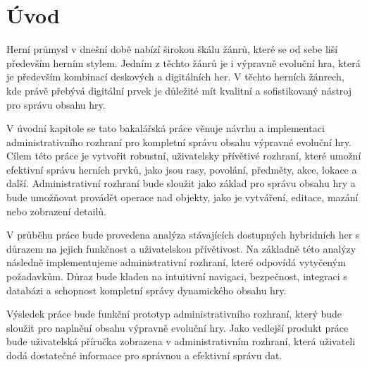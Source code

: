 \chapter{Úvod}
\label{ch:introduction}

Herní průmysl v dnešní době nabízí širokou škálu žánrů, které se od sebe liší především herním stylem. Jedním z těchto žánrů je i výpravně evoluční hra, která je především kombinací deskových a digitálních her. V těchto herních žánrech, kde právě přebývá digitální prvek je důležité mít kvalitní a sofistikovaný nástroj pro správu obsahu hry.

V úvodní kapitole se tato bakalářská práce věnuje návrhu a implementaci administrativního rozhraní pro kompletní správu obsahu výpravné evoluční hry. Cílem této práce je vytvořit robustní, uživatelsky přívětivé rozhraní, které umožní efektivní správu herních prvků, jako jsou rasy, povolání, předměty, akce, lokace a další. Administrativní rozhraní bude sloužit jako základ pro správu obsahu hry a bude umožňovat provádět operace nad objekty, jako je vytváření, editace, mazání nebo zobrazení detailů.

V průběhu práce bude provedena analýza stávajících dostupných hybridních her s důrazem na jejich funkčnost a uživatelskou přívětivost. Na základně této analýzy následně implementujeme administrativní rozhraní, které odpovídá vytyčeným požadavkům. Důraz bude kladen na intuitivní navigaci, bezpečnost, integraci s databázi a schopnost kompletní správy dynamického obsahu hry.

Výsledek práce bude funkční prototyp administrativního rozhraní, který bude sloužit pro naplnění obsahu výpravně evoluční hry. Jako vedlejší produkt práce bude uživatelská příručka zobrazena v administrativním rozhraní, která uživateli dodá dostatečné informace pro správnou a efektivní správu dat.

\endinput